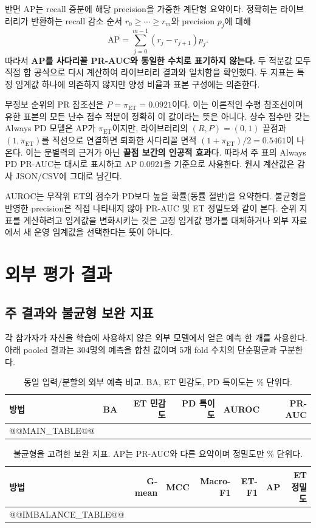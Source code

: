 \documentclass[11pt,a4paper]{article}
\begin{document}
반면 AP는 recall 증분에 해당 precision을 가중한 계단형 요약이다\cite{sklearnap}.
정확히는 라이브러리가 반환하는 recall 감소 순서 $r_0\ge\cdots\ge r_m$와
precision $p_j$에 대해
\begin{equation}
 \mathrm{AP}=\sum_{j=0}^{m-1}(r_j-r_{j+1})p_j.
\end{equation}
따라서 \textbf{AP를 사다리꼴 PR-AUC와 동일한 수치로 표기하지 않는다.}
두 적분값 모두 직접 합 공식으로 다시 계산하여 라이브러리 결과와 일치함을 확인했다.
두 지표는 특정 임계값 하나에 의존하지 않지만 양성 비율과 표본 구성에는 의존한다.

무정보 순위의 PR 참조선은 $P=\pi_{\mathrm{ET}}=0.0921$이다.
이는 이론적인 수평 참조선이며 유한 표본의 모든 난수 점수 적분이 정확히 이 값이라는 뜻은 아니다.
상수 점수만 갖는 Always PD 모델은 AP가 $\pi_{\mathrm{ET}}$이지만,
라이브러리의 $(R,P)=(0,1)$ 끝점과 $(1,\pi_{\mathrm{ET}})$를 직선으로 연결하면
퇴화한 사다리꼴 면적 $(1+\pi_{\mathrm{ET}})/2=0.5461$이 나온다.
이는 분별력의 근거가 아닌 \textbf{끝점 보간의 인공적 효과}다.
따라서 주 표의 Always PD PR-AUC는 대시로 표시하고 AP 0.0921을 기준으로 사용한다.
원시 계산값은 감사 JSON/CSV에 그대로 남긴다.

AUROC는 무작위 ET의 점수가 PD보다 높을 확률(동률 절반)을 요약한다.
불균형을 반영한 precision은 직접 나타내지 않아 PR-AUC 및 ET 정밀도와 같이 본다.
순위 지표를 계산하려고 임계값을 변화시키는 것은 고정 임계값 평가를 대체하거나
외부 자료에서 새 운영 임계값을 선택한다는 뜻이 아니다.
\clearpage

\section{외부 평가 결과}
\subsection{주 결과와 불균형 보완 지표}
각 참가자가 자신을 학습에 사용하지 않은 외부 모델에서 얻은 예측 한 개를 사용한다.
아래 pooled 결과는 304명의 예측을 합친 값이며 5개 fold 수치의 단순평균과 구분한다.
\begin{table}[H]\centering\small
\caption{동일 입력/분할의 외부 예측 비교. BA, ET 민감도, PD 특이도는 \% 단위다.}
\label{tab:main}\setlength{\tabcolsep}{4pt}
\begin{tabular}{@{}lrrrrr@{}}\toprule
방법 & BA & ET 민감도 & PD 특이도 & AUROC & PR-AUC\\\midrule
@@MAIN_TABLE@@
\bottomrule\end{tabular}
\end{table}
\begin{table}[H]\centering\small
\caption{불균형을 고려한 보완 지표. AP는 PR-AUC와 다른 요약이며 정밀도만 \% 단위다.}
\label{tab:imbalance}\setlength{\tabcolsep}{4pt}
\begin{tabular}{@{}lrrrrrr@{}}\toprule
방법 & G-mean & MCC & Macro-F1 & ET-F1 & AP & ET 정밀도\\\midrule
@@IMBALANCE_TABLE@@
\bottomrule\end{tabular}
\end{table}
\end{document}
